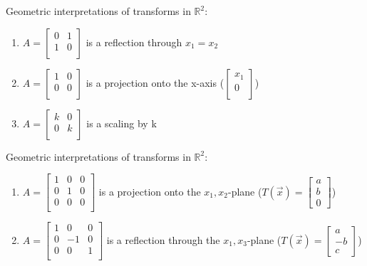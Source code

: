 \documentclass[12pt]{article} %
\newcommand{\R}{\mathbb{R}}
\begin{document}
Geometric interpretations of transforms in $\R^2$:
\begin{enumerate}
	\item $A = \begin{bmatrix}
		0 & 1\\1 & 0\\	
		\end{bmatrix}$ is a reflection through $x_1 = x_2$
	
	\item $A = \begin{bmatrix}
		1 & 0\\0 & 0\\	
	\end{bmatrix}$ is a projection onto the x-axis ($\begin{bmatrix}
		x_1\\ 0\\
	\end{bmatrix}$)

	\item $A = \begin{bmatrix}
		k & 0\\0 & k\\	
	\end{bmatrix}$ is a scaling by k 
\end{enumerate}

Geometric interpretations of transforms in $\R^2$:
\begin{enumerate}
	\item $A = \begin{bmatrix}
		1&0&0\\
		0&1&0\\
		0&0&0\\
		\end{bmatrix}$ is a projection onto the $x_1, x_2$-plane ($T(\vec{x}) = \begin{bmatrix}
		a\\b\\0
		\end{bmatrix}$)
	\item $A = \begin{bmatrix}
			1&0&0\\
			0&-1&0\\
			0&0&1\\
		\end{bmatrix}$ is a reflection through the $x_1, x_3$-plane ($T(\vec{x}) = \begin{bmatrix}
		a\\-b\\c
		\end{bmatrix}$)
\end{enumerate}
\end{document}
